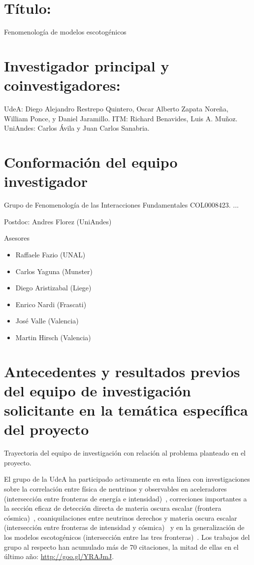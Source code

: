 \section{Título:}
Fenomenología de modelos escotogénicos
\section{Investigador principal y coinvestigadores: }
UdeA: Diego Alejandro Restrepo Quintero,
Oscar Alberto Zapata Noreña, William Ponce, y Daniel Jaramillo. 
ITM: Richard Benavides, Luis A. Muñoz. 
UniAndes: Carlos Ávila y  Juan Carlos Sanabria.

\section{Conformación del equipo investigador }

Grupo de Fenomenología de las Interacciones Fundamentales COL0008423.
...

Postdoc: Andres Florez (UniAndes)


Asesores
\begin{itemize}
\item Raffaele Fazio (UNAL)
\item Carlos Yaguna (Munster)
\item Diego Aristizabal (Liege)
\item Enrico Nardi (Frascati)
\item José Valle (Valencia)
\item Martin Hirsch (Valencia)
\end{itemize}


\section{Antecedentes y resultados previos del equipo de investigación solicitante en la temática específica del proyecto}
\begin{colciencias}
Trayectoria del equipo de investigación con relación al problema planteado en el proyecto.
\end{colciencias}
El grupo de la UdeA ha participado activamente en esta línea con
investigaciones sobre la correlación entre física de neutrinos y
observables en aceleradores (intersección entre fronteras de energía e
intensidad)~\cite{Restrepo:2013aga}, correciones importantes a la sección eficaz de
detección directa de materia oscura escalar (frontera
cósmica)~\cite{Klasen:2013btp}, coaniquilaciones entre neutrinos derechos y
materia oscura escalar (intersección entre fronteras de intensidad y
cósmica)~\cite{Klasen:2013jpa} y en la generalización de los modelos escotogénicos
(intersección entre las tres fronteras)~\cite{Restrepo:2013aga}. Los
trabajos del grupo al respecto han acumulado más de 70 citaciones, la
mitad de ellas en el último año: \url{http://goo.gl/YRAJmJ}.

